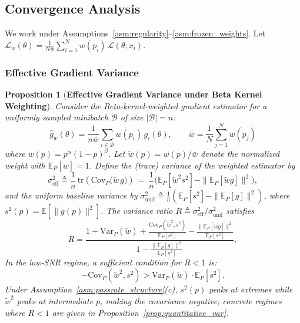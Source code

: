 \documentclass{article}
\newtheorem{proposition}[theorem]{Proposition}
\begin{document}
 \subsection{Convergence Analysis}
\label{app:proof_convergence}

We work under Assumptions~\ref{asm:regularity}--\ref{asm:frozen_weights}. Let $\mathcal{L}_w(\theta) = \frac{1}{N\bar{w}}\sum_{i=1}^{N} w(p_i)\,\mathcal{L}(\theta; x_i)$.

\subsubsection{Effective Gradient Variance}

\begin{proposition}[\textbf{Effective Gradient Variance under Beta Kernel Weighting}]
\label{prop:var_reduction}
Consider the Beta-kernel-weighted gradient estimator for a uniformly sampled minibatch $\mathcal{B}$ of size $|\mathcal{B}| = n$:
\begin{equation}
  \hat{g}_w(\theta) = \frac{1}{n \bar{w}} \sum_{i \in \mathcal{B}} w(p_i) \, g_i(\theta), \qquad \bar{w} = \frac{1}{N}\sum_{j=1}^{N} w(p_j)
\end{equation}
where $w(p) = p^\alpha(1-p)^\beta$. Let $\tilde{w}(p) = w(p)/\bar{w}$ denote the normalized weight with $\mathbb{E}_P[\tilde{w}] = 1$. Define the (trace) variance of the weighted estimator by
\begin{equation}
  \sigma_{\text{eff}}^2 \triangleq \frac{1}{n}\,\text{tr}\!\left(\text{Cov}_P\big(\tilde{w}\,g\big)\right) \,=\, \frac{1}{n}\Big(\mathbb{E}_P[\tilde{w}^2 s^2] - \|\mathbb{E}_P[\tilde{w}g]\|^2\Big),
\end{equation}
and the uniform baseline variance by $\sigma_{\text{unif}}^2 \triangleq \frac{1}{n}(\mathbb{E}_P[s^2] - \|\mathbb{E}_P[g]\|^2)$, where $s^2(p) = \mathbb{E}[\|g(p)\|^2]$. The variance ratio $R \triangleq \sigma_{\text{eff}}^2/\sigma_{\text{unif}}^2$ satisfies
\begin{equation}
  R = \frac{1 + \text{Var}_P(\tilde{w}) + \frac{\text{Cov}_P(\tilde{w}^2, s^2)}{\mathbb{E}_P[s^2]} - \frac{\|\mathbb{E}_P[\tilde{w}g]\|^2}{\mathbb{E}_P[s^2]}}{1 - \frac{\|\mathbb{E}_P[g]\|^2}{\mathbb{E}_P[s^2]}},
  \label{eq:var_ratio}
\end{equation}
In the low-SNR regime, a sufficient condition for $R < 1$ is:
\begin{equation}
 -\text{Cov}_P(\tilde{w}^2, s^2) > \text{Var}_P(\tilde{w}) \cdot \mathbb{E}_P[s^2].
 \label{eq:cov_condition}
\end{equation}
Under Assumption~\ref{asm:passrate_structure}(c), $s^2(p)$ peaks at extremes while $\tilde{w}^2$ peaks at intermediate $p$, making the covariance negative; concrete regimes where $R<1$ are given in Proposition~\ref{prop:quantitative_var}.
\end{proposition}
\end{document}
